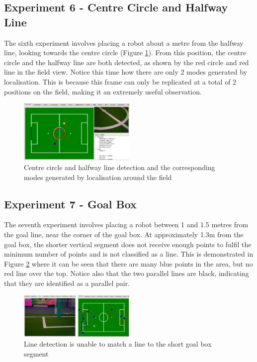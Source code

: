 \documentclass{article}
\begin{document}
\subsection{Experiment 6 - Centre Circle and Halfway Line}
The sixth experiment involves placing a robot about a metre from the halfway line, looking towards the centre circle (Figure \ref{fig:exp6}). From this position, the centre circle and the halfway line are both detected, as shown by the red circle and red line in the field view. Notice this time how there are only 2 modes generated by localisation.  This is because this frame can only be replicated at a total of 2 positions on the field, making it an extremely useful observation.

\begin{figure}[H]
\centering
\includegraphics[width=0.5\textwidth]{Pictures/circleHalfway.jpg}
\caption{Centre circle and halfway line detection and the corresponding modes generated by localisation around the field}
\label{fig:exp6}
\end{figure}


\subsection{Experiment 7 - Goal Box}
The seventh experiment involves placing a robot between 1 and 1.5 metres from the goal line, near the corner of the goal box. At approximately 1.3m from the goal box, the shorter vertical segment does not receive enough points to fulfil the minimum number of points and is not classified as a line. This is demonstrated in Figure \ref{fig:exp7} where it can be seen that there are many blue points in the area, but no red line over the top. Notice also that the two parallel lines are black, indicating that they are identified as a parallel pair.

\begin{figure}[H]
\centering
\includegraphics[width=0.5\textwidth]{Pictures/goalBox.jpg}
\caption{Line detection is unable to match a line to the short goal box segment}
\label{fig:exp7}
\end{figure}
\end{document}
